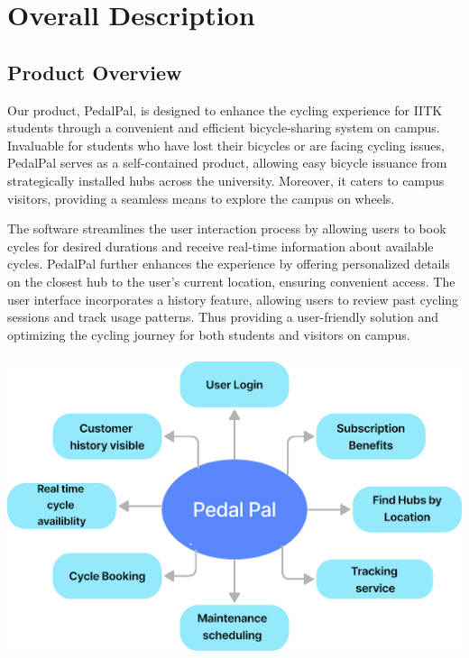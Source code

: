 \documentclass[11pt]{article}
\begin{document}
\newpage
\section{Overall Description}
\subsection{Product Overview}
Our product, PedalPal, is designed to enhance the cycling experience for IITK students through a convenient and efficient bicycle-sharing system on campus. Invaluable for students who have lost their bicycles or are facing cycling issues, PedalPal serves as a self-contained product, allowing easy bicycle issuance from strategically installed hubs across the university. Moreover, it caters to campus visitors, providing a seamless means to explore the campus on wheels. 

The software streamlines the user interaction process by allowing users to book cycles for desired durations and receive real-time information about available cycles. PedalPal further enhances the experience by offering personalized details on the closest hub to the user's current location, ensuring convenient access. The user interface incorporates a history feature, allowing users to review past cycling sessions and track usage patterns. Thus providing a user-friendly solution and optimizing the cycling journey for both students and visitors on campus.
\\
\\
\includegraphics[scale=0.9]{Overview.png}
\end{document}
